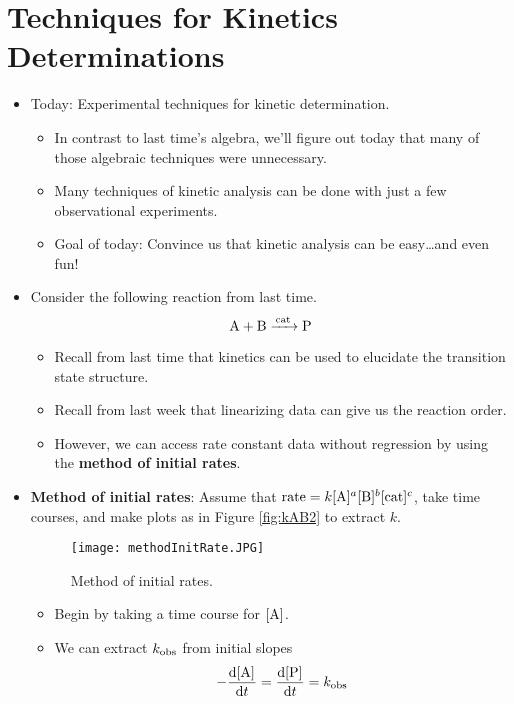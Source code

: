 \documentclass[../notes.tex]{subfiles}
\begin{document}
\section{Techniques for Kinetics Determinations}
\begin{itemize}
    \item {}Today: Experimental techniques for kinetic determination.
    \begin{itemize}
        \item In contrast to last time's algebra, we'll figure out today that many of those algebraic techniques were unnecessary.
        \item Many techniques of kinetic analysis can be done with just a few observational experiments.
        \item Goal of today: Convince us that kinetic analysis can be easy\dots and even fun!
    \end{itemize}
    \item Consider the following reaction from last time.
    \begin{equation*}
        \ce{A + B ->[cat] P}
    \end{equation*}
    \begin{itemize}
        \item Recall from last time that kinetics can be used to elucidate the transition state structure.
        \item Recall from last week that linearizing data can give us the reaction order.
        \item However, we can access rate constant data without regression by using the \textbf{method of initial rates}.
    \end{itemize}
    \item \textbf{Method of initial rates}: Assume that $\rate=k\cnc{A}^a\cnc{B}^b\cnc{cat}^c$, take time courses, and make plots as in Figure \ref{fig:kAB2} to extract $k$.
    \begin{figure}[h!]
        \centering
        \texttt{[image: methodInitRate.JPG]}
        \caption{Method of initial rates.}
        \label{fig:methodInitRate}
    \end{figure}
    \begin{itemize}
        \item Begin by taking a time course for $\cnc{A}$.
        \item We can extract $k_\textup{obs}$ from initial slopes
        \begin{equation*}
            -\dv{\cnc{A}}{t} = \dv{\cnc{P}}{t} = \kobs

\end{equation*}
\end{itemize}
\end{itemize}
\end{document}
